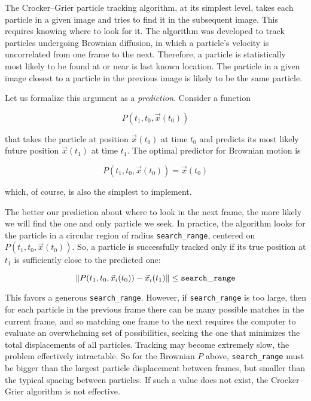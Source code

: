 The Crocker--Grier particle tracking algorithm, at its simplest level, takes each particle in
a given image and tries to find it in the subsequent image. This
requires knowing where to look for it. The algorithm was developed to track particles undergoing Brownian diffusion,
in which a particle's velocity is uncorrelated from one
frame to the next. Therefore, a particle is statistically most likely to be found at or near is last known location. The particle in a given image closest to a particle in the previous image is likely to be the same particle.

Let us formalize this argument as a \emph{prediction}. Consider a function

\begin{equation}
P(t_1, t_0, \vec x(t_0))
\end{equation}

\noindent that takes the particle at position $\vec x(t_0)$ at time $t_0$ and predicts its most likely 
future position $\vec x(t_1)$ at time $t_1$. The optimal predictor for Brownian motion
is

\begin{equation}
P(t_1, t_0, \vec x(t_0)) = \vec x(t_0)
\end{equation}

\noindent which, of course, is also the simplest to implement.

The better our prediction about where to look in the next frame, the
more likely we will find the one and only particle we seek.
In practice, the algorithm looks for the particle in a circular region of radius
\texttt{search\_range}, centered on $P(t_1, t_0, \vec x(t_0))$. So, a particle is successfully tracked only if its true position at $t_1$ is sufficiently close to the predicted one:

\begin{equation}
\label{eqn:brownian-predictor}
\|P(t_1, t_0, \vec x_i(t_0)) - \vec x_i(t_1)\| \le \tt{search\_range}
\end{equation}

This favors a generous \texttt{search\_range}. However, if
\texttt{search\_range} is too large, then for each particle in the
previous frame there can be many possible matches in the current frame,
and so matching one frame to the next requires the computer to evaluate
an overwhelming set of possibilities, seeking the one that minimizes the total displacements of all particles. Tracking may become extremely
slow, the problem effectively intractable.
So for the Brownian $P$ above, \texttt{search\_range} must be bigger
than the largest particle displacement between frames, but smaller than
the typical spacing between particles\cite{Crocker1996}. If such a value does not exist, the Crocker--Grier algorithm is not effective.

